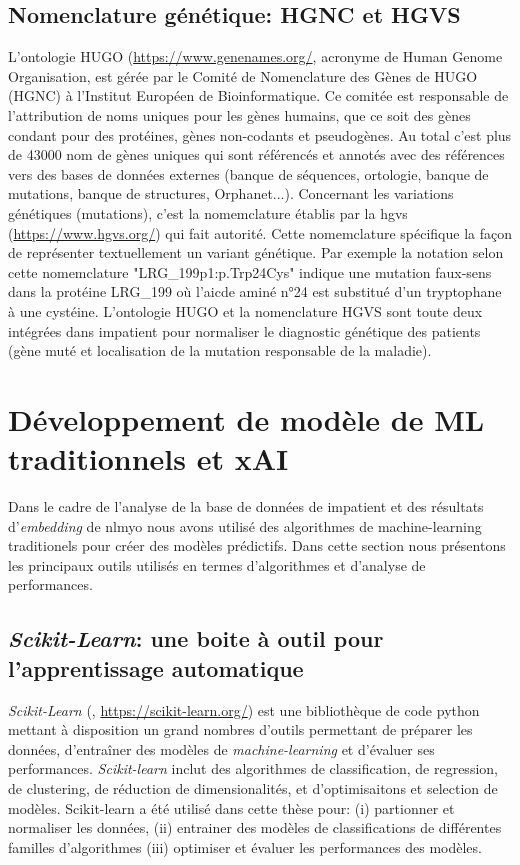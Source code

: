 \subsection{Nomenclature génétique: HGNC et HGVS}
L'ontologie HUGO (\href{https://www.genenames.org/}{https://www.genenames.org/}, acronyme de Human Genome Organisation, est gérée par le Comité de Nomenclature des Gènes de HUGO (HGNC) à l'Institut Européen de Bioinformatique. Ce comitée est responsable de l'attribution de noms uniques pour les gènes humains, que ce soit des gènes condant pour des protéines, gènes non-codants et pseudogènes. Au total c'est plus de 43000 nom de gènes uniques qui sont référencés et annotés avec des références vers des bases de données externes (banque de séquences, ortologie, banque de mutations, banque de structures, Orphanet...). Concernant les variations génétiques (mutations), c'est la nomemclature établis par la \gls{hgvs} (\href{https://www.hgvs.org/}{https://www.hgvs.org/}) qui fait autorité. Cette nomemclature spécifique la façon de représenter textuellement un variant génétique. Par exemple la notation selon cette nomemclature "LRG\_199p1:p.Trp24Cys" indique une mutation faux-sens dans la protéine LRG\_199 où l'aicde aminé n°24 est substitué d'un tryptophane à une cystéine. L'ontologie HUGO et la nomenclature HGVS sont toute deux intégrées dans \gls{impatient} pour normaliser le diagnostic génétique des patients (gène muté et localisation de la mutation responsable de la maladie).

\section{Développement de modèle de ML traditionnels et xAI}
Dans le cadre de l'analyse de la base de données de \gls{impatient} et des résultats d'\textit{embedding} de \gls{nlmyo} nous avons utilisé des algorithmes de machine-learning traditionels pour créer des modèles prédictifs. Dans cette section nous présentons les principaux outils utilisés en termes d'algorithmes et d'analyse de performances.

\subsection{\textit{Scikit-Learn}: une boite à outil pour l'apprentissage automatique}
\textit{Scikit-Learn} (\cite{pedregosa_scikit-learn_2011}, \href{https://scikit-learn.org/}{https://scikit-learn.org/}) est une bibliothèque de code python mettant à disposition un grand nombres d'outils permettant de préparer les données, d'entraîner des modèles de \textit{machine-learning} et d'évaluer ses performances. \textit{Scikit-learn} inclut des algorithmes de classification, de regression, de clustering, de réduction de dimensionalités, et d'optimisaitons et selection de modèles. Scikit-learn a été utilisé dans cette thèse pour: (i) partionner et normaliser les données, (ii) entrainer des modèles de classifications de différentes familles d'algorithmes (iii) optimiser et évaluer les performances des modèles.

